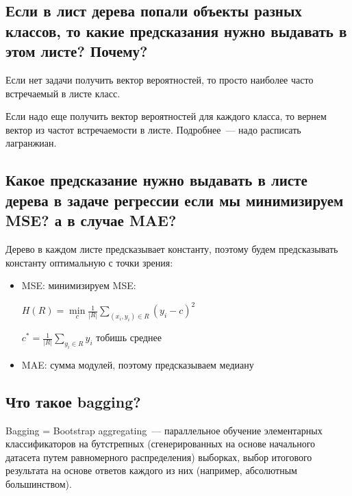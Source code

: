 \subsection{Если в лист дерева попали объекты разных классов, то какие предсказания нужно выдавать в этом листе? Почему?}

Если нет задачи получить вектор вероятностей, то просто наиболее часто встречаемый в листе класс.

Если надо еще получить вектор вероятностей для каждого класса, то вернем вектор из частот встречаемости в листе. Подробнее~--- надо расписать лагранжиан.
















\subsection{Какое предсказание нужно выдавать в листе дерева в задаче регрессии если мы
минимизируем MSE? а в случае MAE?}

Дерево в каждом листе предсказывает константу, поэтому будем предсказывать константу оптимальную с точки зрения:

\begin{itemize}
    \item MSE: минимизируем MSE:
    
    $H(R) =\min\limits_c \frac{1}{|R|} \sum\limits_{(x_i, y_i) \in R} (y_i - c)^2$
    
    $c^* = \frac{1}{|R|} \sum \limits_{y_i \in R} y_i$ тобишь среднее
    
    \item MAE: сумма модулей, поэтому предсказываем медиану
\end{itemize}













\subsection{Что такое bagging?}

\Def Bagging = Bootstrap aggregating~--- параллельное обучение элементарных классификаторов на бутстрепных (сгенерированных на основе начального датасета путем равномерного распределения) выборках, выбор итогового результата на основе ответов каждого из них (например, абсолютным большинством).

